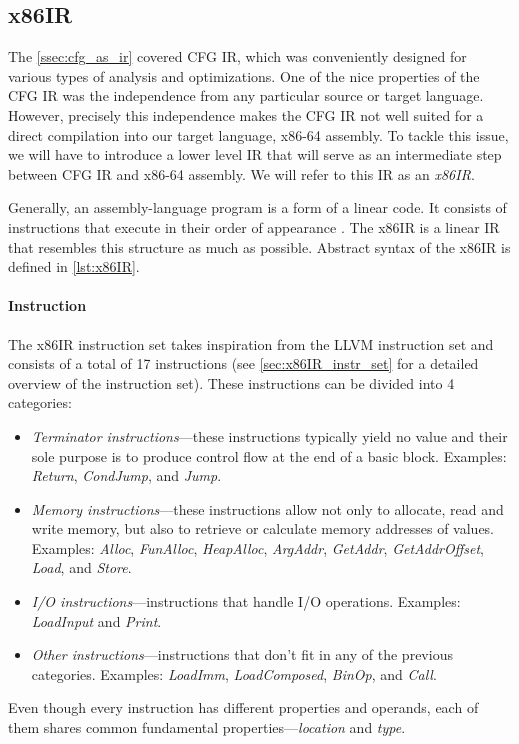 \documentclass[thesis=M,english]{FITthesis}[2019/12/23]
\begin{document}
\subsection{x86IR}\label{ssec:x86ir}
The \autoref{ssec:cfg_as_ir} covered CFG IR, which was conveniently designed for various types of analysis and optimizations. One of the nice properties of the CFG IR was the independence from any particular source or target language. However, precisely this independence makes the CFG IR not well suited for a direct compilation into our target language, x86-64 assembly. To tackle this issue, we will have to introduce a lower level IR that will serve as an intermediate step between CFG IR and x86-64 assembly. We will refer to this IR as an \emph{x86IR}.

Generally, an assembly-language program is a form of a linear code. It consists of instructions that execute in their order of appearance \cite[Chap. 5.3]{eng_comp}. The x86IR is a linear IR that resembles this structure as much as possible. Abstract syntax of the x86IR is defined in \autoref{lst:x86IR}.

\paragraph*{Instruction} The x86IR instruction set takes inspiration from the LLVM instruction set \cite[Instruction Reference]{llvm} and consists of a total of 17 instructions (see \autoref{sec:x86IR_instr_set} for a detailed overview of the instruction set). These instructions can be divided into 4 categories:
\begin{itemize}
    \item \emph{Terminator instructions}---these instructions typically yield no value and their sole purpose is to produce control flow at the end of a basic block. Examples: \emph{Return}, \emph{CondJump}, and \emph{Jump}.
    \item \emph{Memory instructions}---these instructions allow not only to allocate, read and write memory, but also to retrieve or calculate memory addresses of values. Examples: \emph{Alloc}, \emph{FunAlloc}, \emph{HeapAlloc}, \emph{ArgAddr}, \emph{GetAddr}, \emph{GetAddrOffset}, \emph{Load}, and \emph{Store}.
    \item \emph{I/O instructions}---instructions that handle I/O operations. Examples: \emph{LoadInput} and \emph{Print}.
    \item \emph{Other instructions}---instructions that don't fit in any of the previous categories. Examples: \emph{LoadImm}, \emph{LoadComposed}, \emph{BinOp}, and \emph{Call}.
\end{itemize}
Even though every instruction has different properties and operands, each of them shares common fundamental properties---\emph{location} and \emph{type}.
\end{document}
